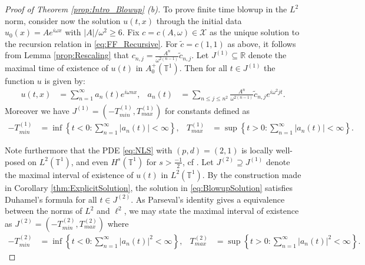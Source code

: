 \documentclass{article}
\newcommand{\R}{\mathbb{R}}
\newcommand{\T}{\mathbb{T}}
\newcommand{\cX}{\mathcal{X}}
\begin{document}
\begin{proof}[Proof of Theorem \ref{prop:Intro_Blowup} (b)]
 	To prove finite time blowup in the $L^2$ norm, consider now the solution $ u(t,x)$ through the initial data $u_0(x) = A e^{i \omega x}$ with $|A|/\omega^2 \geq 6$.  
 	Fix $c = c(A,\omega)   \in \cX$ as the unique solution to the recursion relation in \eqref{eq:FF_Recursive}. For $ \tilde{c} = c(1,1)$ as above, it follows from Lemma \ref{prop:Rescaling}   that $ c_{n,j} = 	\frac{A^n}{\omega^{2(n-1)}}
 	\tilde{c}_{n,j}  $. 
 	Let 	$J^{(1)} \subseteq \R$ denote the  maximal time of existence of $u(t)$ in $A^+_0(\T^1)$. 
 	Then for all $ t \in J^{(1)}$ the function $u$ is given by: 
 	\begin{align} \label{eq:BlowupSolution}
 			u(t,x) &=
 		\sum_{n=1}^{\infty} 
a_n(t)
 		e^{i \omega n x} ,
 		&
 		a_n(t) &=	\sum_{n \leq j \leq n^2} 
 		\frac{A^n}{\omega^{2(n-1)}}
 		\tilde{c}_{n,j} 
 		e^{i \omega^2 j t} .
 	\end{align}
 	Moreover we have $  J^{(1)} = (-T_{min}^{(1)},T_{max}^{(1)})$ for constants defined as  
 	\begin{align*}
 	-T_{min}^{(1)} &= \inf \left\{ t < 0 : \sum_{n=1}^\infty | a_n(t) | < \infty \right\}
 	,
 	&
 	T_{max}^{(1)} &= \sup \left\{ t > 0 : \sum_{n=1}^\infty | a_n(t) | < \infty \right\}.
 	\end{align*}
 	
 	
 	Note furthermore that the PDE \eqref{eq:NLS} with $(p,d)=(2,1)$ is locally well-posed on $L^2(\T^1)$, and even $ H^{s}(\T^1)$ for $ s > \frac{-1}{2}$, cf \cite{kenig1996quadratic}. Let $ J^{(2)} \supseteq J^{(1)}$ denote the maximal interval of existence of $u(t)$ in $L^2(\T^1)$. 
 	By the construction made in Corollary \ref{thm:ExplicitSolution}, the solution in \eqref{eq:BlowupSolution} satisfies Duhamel's formula for all $ t \in J^{(2)}$. 
 	As Parseval's identity gives a equivalence between the norms of $L^2$ and $ \ell^2$, we may state the maximal interval of existence as 	$  J^{(2)} = (-T_{min}^{(2)},T_{max}^{(2)})$ where  	
 	\begin{align*}
 	-T_{min}^{(2)} &= \inf \left\{ t < 0 : \sum_{n=1}^\infty | a_n(t) |^2 < \infty \right\}
 	,
 	&
 	T_{max}^{(2)} &= \sup \left\{ t > 0 : \sum_{n=1}^\infty | a_n(t) |^2 < \infty \right\}.
 	\end{align*}
 	

\end{proof}
\end{document}
